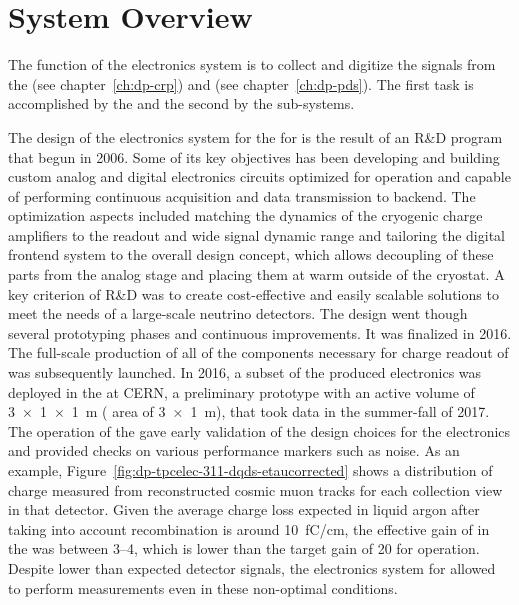 \section{System Overview}
\label{sec:dp-tpcelec-overview}

The function of the   electronics system is to collect and digitize the signals from the  (see chapter~\ref{ch:dp-crp}) and  (see chapter~\ref{ch:dp-pds}). The first task is accomplished by the  and the second by the  sub-systems. 

The design of the electronics system for the for   is the result of an R\&D program that begun in 2006. Some of its key objectives has been developing and building custom analog and digital electronics circuits optimized for  operation and capable of performing continuous acquisition and data transmission to  backend. The optimization aspects included matching the dynamics of the cryogenic charge amplifiers to the  readout and wide signal dynamic range and tailoring the digital frontend system to the overall  design concept, which allows decoupling of these parts from the analog stage and placing them at warm outside of the cryostat. A key criterion of R\&D was to create cost-effective and easily scalable solutions to meet the needs of a large-scale neutrino  detectors. The design went though several prototyping phases and continuous improvements. It was finalized in 2016. The full-scale production of all of the components necessary for charge readout of  was subsequently launched. In 2016, a subset of the produced electronics was deployed in the  at CERN, a preliminary \dual \lartpc prototype with an active volume  of \SI[product-units=power]{3x1x1}{m} ( area of \SI[product-units=power]{3x1}{m}), that took data in the summer-fall of 2017. The operation of the  \cite{Aimard:2018yxp} gave early validation of the design choices for the electronics and provided checks on various performance markers such as noise. As an example, Figure~\ref{fig:dp-tpcelec-311-dqds-etaucorrected} shows a distribution of charge measured from reconstructed cosmic muon tracks for each collection view in that detector. Given the average  charge loss expected in liquid argon after taking into account recombination is around \SI{10}{\femto\coulomb/\cm}, the effective gain of  in the  was between \numrange{3}{4}, which is lower than the target gain of \num{20} for  operation. Despite lower than expected detector signals, the electronics system for  allowed to perform measurements even in these non-optimal conditions.

